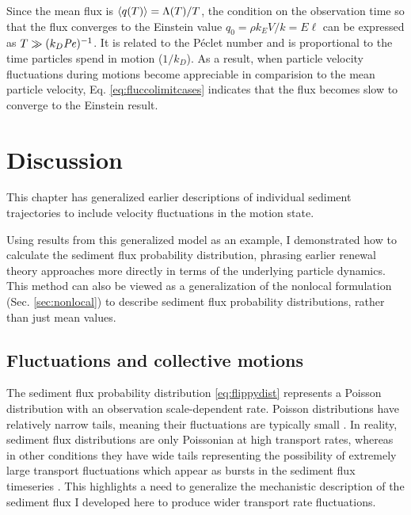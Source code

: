 Since the mean flux is $\langle q(T) \rangle = \Lambda(T)/T$, the condition on the observation time so that the flux converges to the Einstein value $q_0 = \rho k_E V/k = E \ell$ can be expressed as $T\gg (k_D \mbox{\textit{Pe}})^{-1}$. It is related to the P\'{e}clet number and is proportional to the time particles spend in motion ($1/k_D$). As a result, when particle velocity fluctuations during motions become appreciable in comparision to the mean particle velocity, Eq. \ref{eq:fluccolimitcases} indicates that the flux becomes slow to converge to the Einstein result.

\section{Discussion \label{sec:disc}}

This chapter has generalized earlier descriptions of individual sediment trajectories \citep[e.g.][]{Lisle1998,Lajeunesse2017} to include velocity fluctuations in the motion state.

Using results from this generalized model as an example, I demonstrated how to calculate the sediment flux probability distribution, phrasing earlier renewal theory approaches \citep[e.g.][]{Turowski2010,Ancey2020} more directly in terms of the underlying particle dynamics.
This method can also be viewed as a generalization of the nonlocal formulation (Sec. \ref{sec:nonlocal}) to describe sediment flux probability distributions, rather than just mean values.

\subsection{Fluctuations and collective motions}

The sediment flux probability distribution \ref{eq:flippydist} represents a Poisson distribution with an observation scale-dependent rate.
Poisson distributions have relatively narrow tails, meaning their fluctuations are typically small \citep{Ancey2006}.
In reality, sediment flux distributions are only Poissonian at high transport rates, whereas in other conditions they have wide tails representing the possibility of extremely large transport fluctuations \citep{Ancey2008,Turowski2010,Saletti2015} which appear as bursts \citep[e.g.][]{Goh2008} in the sediment flux timeseries \citep{Singh2009, Dhont2018,Benavides2021}. 
This highlights a need to generalize the mechanistic description of the sediment flux I developed here to produce wider transport rate fluctuations.

